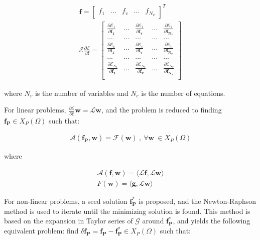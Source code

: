 \documentclass{CFD2011}
\begin{document}
\begin{eqnarray}
\mathbf{f}=\left[ \begin{array}{ccccc} f_1 & ... & f_{v} & ... & f_{N_v} \end{array} \right]^T \nonumber\\
 {\mathcal{E}} {\frac{\partial\mathcal{E}}{\partial \mathbf{f}}}=\left[ \begin{array}{ccccc}
 {\frac{\partial\mathcal{E}_{1}}{\partial \mathbf{f_1}}} & ... &  {\frac{\partial\mathcal{E}_{1}}{\partial \mathbf{f_v}}} & ... &  {\frac{\partial\mathcal{E}_{1}}{\partial \mathbf{f_{N_v}}}} \\
... & ... & ... & ... & ... \\
 {\frac{\partial\mathcal{E}_{c}}{\partial \mathbf{f_{1}}}} & ... &  {\frac{\partial\mathcal{E}_{c}}{\partial \mathbf{f_{v}}}} & ... &  {\frac{\partial\mathcal{E}_{c}}{\partial \mathbf{f_{N_v}}}} \\
... & ... & ... & ... & ... \\
 {\frac{\partial\mathcal{E}_{N_c}}{\partial \mathbf{f_{1}}}} & ... &  {\frac{\partial\mathcal{E}_{N_c}}{\partial \mathbf{f_{v}}}} & ... &  {\frac{\partial\mathcal{E}_{N_c}}{\partial \mathbf{f_{N_v}}}} \\
\end{array} \right] 
\label{eq:eqOp}
\end{eqnarray}

\noindent where $N_v$ is the number of variables and $N_c$ is the number of equations.

For linear problems, $\frac{\partial\mathcal{E}}{\partial \mathbf{f}}\mathbf{w}=\mathcal{L}\mathbf{w}$, and the problem is reduced to finding $\mathbf{f_P} \in X_P(\Omega)$ such that:


\begin{eqnarray}
\mathcal{A}(\mathbf{f_P},\mathbf{w})=\mathcal{F}(\mathbf{w}) \ ,\ \forall \mathbf{w} \ \in X_P(\Omega)
\label{eq:equivalent}
\end{eqnarray}

\noindent where

\begin{eqnarray}
\mathcal{A}(\mathbf{f},\mathbf{w})= \langle \mathcal{L}\mathbf{f},\mathcal{L}\mathbf{w} \rangle \nonumber \\ 
F(\mathbf{w})= \langle \mathbf{g},\mathcal{L}\mathbf{w} \rangle 
\label{eq:equivLinear}
\end{eqnarray}




For non-linear problems, a seed solution $\mathbf{f^*_P}$ is proposed, and the Newton-Raphson method is used to iterate until the minimizing solution is found. This method is based on the expansion in Taylor series of $\mathcal{G}$ around $\mathbf{f^*_P}$, and yields the following equivalent problem: find $\delta\mathbf{f_P}=\mathbf{f_P}-\mathbf{f^*_P} \in X_P(\Omega)$ such that:
\end{document}
